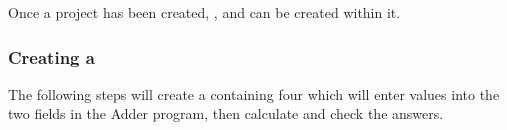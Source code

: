 
Once a project has been created, \gdcases{}, \gdsteps and \gdsuites can be
created within it. 

\subsubsection{Creating a \gdcase}

The following steps will create a \gdcase containing
four \gdsteps which will enter values into the two fields in the 
Adder program, then  calculate and check
the answers.   

